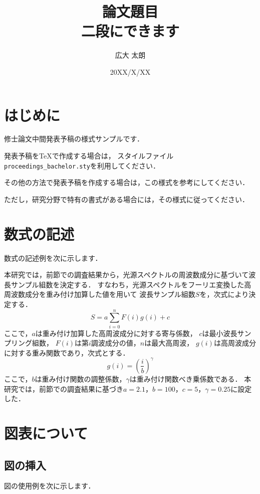 \documentclass[10pt, a4paper, twocolumn]{jarticle}
\title{論文題目\\二段にできます}
\author{広大 太朗}
\affiliation{広島大学 大学院先進理工系科学研究科 情報科学プログラム}
\date{20XX/X/XX}
\begin{document}
\maketitle


\section{はじめに}
修士論文中間発表予稿の様式サンプルです．


発表予稿を\TeX{}で作成する場合は，
スタイルファイル\verb+proceedings_bachelor.sty+を利用してください．


その他の方法で発表予稿を作成する場合は，この様式を参考にしてください．


ただし，研究分野で特有の書式がある場合には，その様式に従ってください．


\section{数式の記述}
数式の記述例を次に示します．


本研究では，前節での調査結果から，光源スペクトルの周波数成分に基づいて波長サンプル組数を決定する．
すなわち，光源スペクトルをフーリエ変換した高周波数成分を重み付け加算した値を用いて
波長サンプル組数$S$を，次式により決定する．
%
\begin{equation}
S = a\sum_{i=0}^{n}F(i)g(i)+c
\end{equation}
%
ここで，$a$は重み付け加算した高周波成分に対する寄与係数，
$c$は最小波長サンプリング組数，
$F(i)$は第$i$調波成分の値，$n$は最大高周波，
$g(i)$は高周波成分に対する重み関数であり，次式とする．
%
\begin{equation}
g(i) = {\left(\frac{i}{b}\right)}^\gamma
\end{equation}
%
ここで，$b$は重み付け関数の調整係数，$\gamma$は重み付け関数べき乗係数である．
本研究では，前節での調査結果に基づき$a=2.1$，$b=100$，$c=5$，$\gamma=0.25$に設定した．
\newpage

\section{図表について}
\subsection{図の挿入}
図の使用例を次に示します．
\newline
\end{document}
